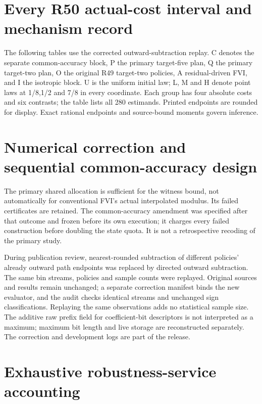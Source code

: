 \documentclass[ecta,nameyear,draft]{econsocart}
\begin{document}
\section{Every R50 actual-cost interval and mechanism record}\label{supp:records50}
The following tables use the corrected outward-subtraction replay. C denotes the separate common-accuracy block, P the primary target-five plan, Q the primary target-two plan, O the original R49 target-two policies, A residual-driven FVI, and I the isotropic block. U is the uniform initial law; L, M and H denote point laws at 1/8,1/2 and 7/8 in every coordinate. Each group has four absolute costs and six contrasts; the table lists all 280 estimands. Printed endpoints are rounded for display. Exact rational endpoints and source-bound moments govern inference.





\section{Numerical correction and sequential common-accuracy design}\label{supp:corrections50}
The primary shared allocation is sufficient for the witness bound, not automatically for conventional FVI's actual interpolated modulus. Its failed certificates are retained. The common-accuracy amendment was specified after that outcome and frozen before its own execution; it charges every failed construction before doubling the state quota. It is not a retrospective recoding of the primary study.

During publication review, nearest-rounded subtraction of different policies' already outward path endpoints was replaced by directed outward subtraction. The same bin streams, policies and sample counts were replayed. Original sources and results remain unchanged; a separate correction manifest binds the new evaluator, and the audit checks identical streams and unchanged sign classifications. Replaying the same observations adds no statistical sample size. The additive raw prefix field for coefficient-bit descriptors is not interpreted as a maximum; maximum bit length and live storage are reconstructed separately. The correction and development logs are part of the release.


\section{Exhaustive robustness-service accounting}\label{supp:work52}





\end{document}
